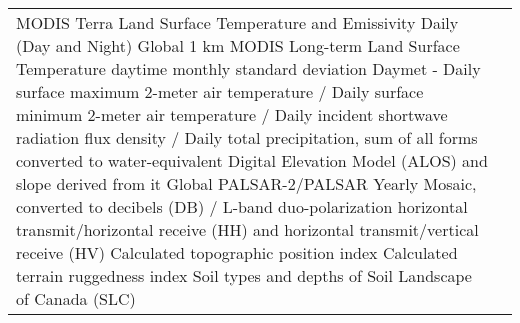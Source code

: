 \documentclass[times,final]{elsarticle}
\begin{document}
{\begin{longtable}{|p{33mm}|p{94mm}|}
                    	MODIS Terra Land Surface Temperature and Emissivity Daily (Day and Night) Global 1 km
                    	\newline \newline
                    	MODIS Long-term Land Surface Temperature daytime monthly standard deviation
                    	\newline\newline
                    	Daymet - Daily surface maximum 2-meter air temperature / Daily surface minimum 2-meter air temperature / Daily incident shortwave radiation flux density / Daily total precipitation, sum of all forms converted to water-equivalent
                    	\newline \newline
                    	Digital Elevation Model (ALOS) and slope derived from it
                    	\newline \newline
                    	Global PALSAR-2/PALSAR Yearly Mosaic, converted to decibels (DB) / 
                        L-band duo-polarization horizontal transmit/horizontal receive (HH) and horizontal transmit/vertical receive (HV)
                        \newline \newline
                        Calculated topographic position index \cite{2}
                        \newline \newline
                        Calculated terrain ruggedness index \cite{3}
                        \newline \newline
                        Soil types and depths of Soil Landscape of Canada (SLC) 
                        \\






\end{longtable}}
\end{document}
